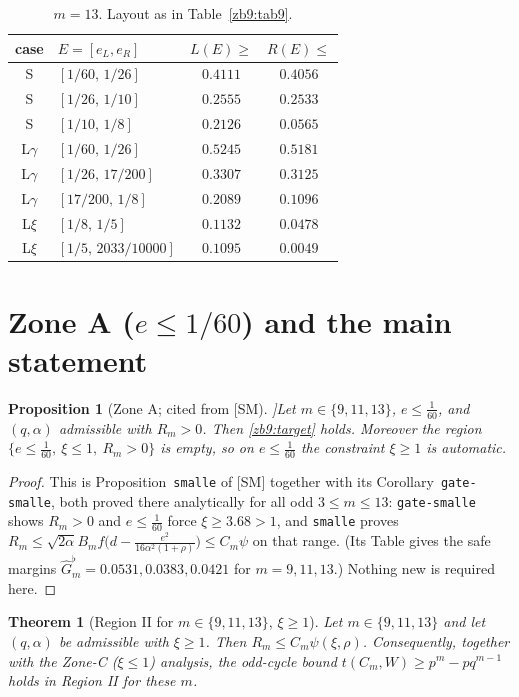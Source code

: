 \documentclass[11pt]{article}
\newtheorem{theorem}[lemma]{Theorem}
\newtheorem{proposition}[lemma]{Proposition}
\theoremstyle{remark}
\newcommand{\SM}{[SM]}
\begin{document}
\begin{table}[h]\centering
\caption{$m=13$.  Layout as in Table~\ref{zb9:tab9}.}\label{zb9:tab13}
\begin{tabular}{clcc}
\toprule
case & $E=[e_L,e_R]$ & $L(E)\ge$ & $R(E)\le$\\
\midrule
S       & $[1/60,\,1/26]$    & $0.4111$ & $0.4056$\\
S       & $[1/26,\,1/10]$    & $0.2555$ & $0.2533$\\
S       & $[1/10,\,1/8]$     & $0.2126$ & $0.0565$\\
\midrule
L$\gamma$ & $[1/60,\,1/26]$  & $0.5245$ & $0.5181$\\
L$\gamma$ & $[1/26,\,17/200]$& $0.3307$ & $0.3125$\\
L$\gamma$ & $[17/200,\,1/8]$ & $0.2089$ & $0.1096$\\
\midrule
L$\xi$  & $[1/8,\,1/5]$      & $0.1132$ & $0.0478$\\
L$\xi$  & $[1/5,\,2033/10000]$ & $0.1095$ & $0.0049$\\
\bottomrule
\end{tabular}
\end{table}

\section{Zone A ($e\le1/60$) and the main statement}\label{zb9:sec:zoneA}

\begin{proposition}[Zone A; cited from \SM]\label{zb9:zoneA}
Let $m\in\{9,11,13\}$, $e\le\tfrac1{60}$, and $(q,\alpha)$ admissible with
$R_m>0$.  Then \eqref{zb9:target} holds.  Moreover the region
$\{e\le\tfrac1{60},\ \xi\le1,\ R_m>0\}$ is empty, so on $e\le\tfrac1{60}$ the
constraint $\xi\ge1$ is automatic.
\end{proposition}

\begin{proof}
This is Proposition~\texttt{smalle} of \SM{} together with its
Corollary~\texttt{gate-smalle}, both proved there analytically for all odd
$3\le m\le13$: \texttt{gate-smalle} shows $R_m>0$ and $e\le\tfrac1{60}$ force
$\xi\ge3.68>1$, and \texttt{smalle} proves
$R_m\le\sqrt{2\alpha}B_mf\bigl(d-\tfrac{e^2}{16\alpha^2(1+\rho)}\bigr)\le
C_m\psi$ on that range.  (Its Table gives the safe margins
$\widehat G_m^{\flat}=0.0531,0.0383,0.0421$ for $m=9,11,13$.)  Nothing new is
required here.
\end{proof}

\begin{theorem}[Region II for $m\in\{9,11,13\}$, $\xi\ge1$]\label{zb9:main}
Let $m\in\{9,11,13\}$ and let $(q,\alpha)$ be admissible with $\xi\ge1$.
Then $R_m\le C_m\psi(\xi,\rho)$.  Consequently, together with the Zone-C
($\xi\le1$) analysis, the odd-cycle bound $t(C_m,W)\ge p^m-pq^{m-1}$ holds in
Region II for these $m$.
\end{theorem}
\end{document}
